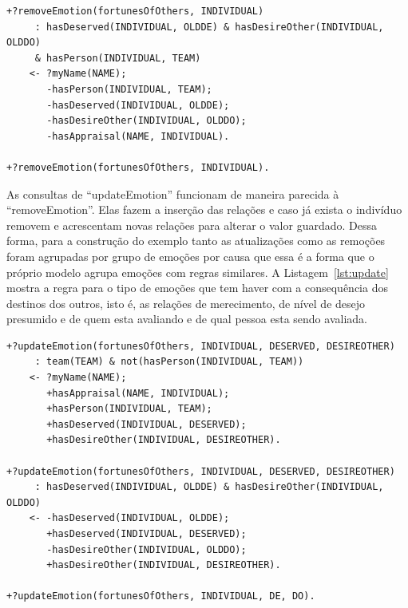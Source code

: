 \begin{center}
    \begin{minipage}{130mm}
	\lstset{linewidth=130mm}
	\begin{lstlisting}[frame=trbl,
caption=Amostra de remoção de emoção do tipo destino de outros,
label=lst:removeSample]
+?removeEmotion(fortunesOfOthers, INDIVIDUAL)
     : hasDeserved(INDIVIDUAL, OLDDE) & hasDesireOther(INDIVIDUAL, OLDDO)
     & hasPerson(INDIVIDUAL, TEAM)
    <- ?myName(NAME);
       -hasPerson(INDIVIDUAL, TEAM);
       -hasDeserved(INDIVIDUAL, OLDDE);
       -hasDesireOther(INDIVIDUAL, OLDDO);
       -hasAppraisal(NAME, INDIVIDUAL).

+?removeEmotion(fortunesOfOthers, INDIVIDUAL).
	\end{lstlisting}
    \end{minipage}
\end{center}

As consultas de ``updateEmotion'' funcionam de maneira parecida à
``removeEmotion''. Elas fazem a inserção das relações e caso já exista o
indivíduo removem e acrescentam novas relações para alterar o valor guardado.
Dessa forma, para a construção do exemplo tanto as atualizações como as
remoções foram agrupadas por grupo de emoções por causa que essa é a forma que
o próprio modelo \occ agrupa emoções com regras similares. A Listagem~\ref{lst:update}
mostra a regra para o tipo de emoções que tem haver com a consequência dos
destinos dos outros, isto é, as relações de merecimento, de nível de
desejo presumido e de quem esta avaliando e de qual pessoa esta sendo
avaliada.

\begin{center}
    \begin{minipage}{130mm}
	\lstset{linewidth=130mm}
	\begin{lstlisting}[frame=trbl,
caption=Amostra de código referente as atualizações de emoções do tipo destino de outros,
label=lst:update]
+?updateEmotion(fortunesOfOthers, INDIVIDUAL, DESERVED, DESIREOTHER)
     : team(TEAM) & not(hasPerson(INDIVIDUAL, TEAM))
    <- ?myName(NAME);
       +hasAppraisal(NAME, INDIVIDUAL);
       +hasPerson(INDIVIDUAL, TEAM);
       +hasDeserved(INDIVIDUAL, DESERVED);
       +hasDesireOther(INDIVIDUAL, DESIREOTHER).

+?updateEmotion(fortunesOfOthers, INDIVIDUAL, DESERVED, DESIREOTHER)
     : hasDeserved(INDIVIDUAL, OLDDE) & hasDesireOther(INDIVIDUAL, OLDDO)
    <- -hasDeserved(INDIVIDUAL, OLDDE);
       +hasDeserved(INDIVIDUAL, DESERVED);
       -hasDesireOther(INDIVIDUAL, OLDDO);
       +hasDesireOther(INDIVIDUAL, DESIREOTHER).

+?updateEmotion(fortunesOfOthers, INDIVIDUAL, DE, DO).
	\end{lstlisting}
    \end{minipage}
\end{center}

